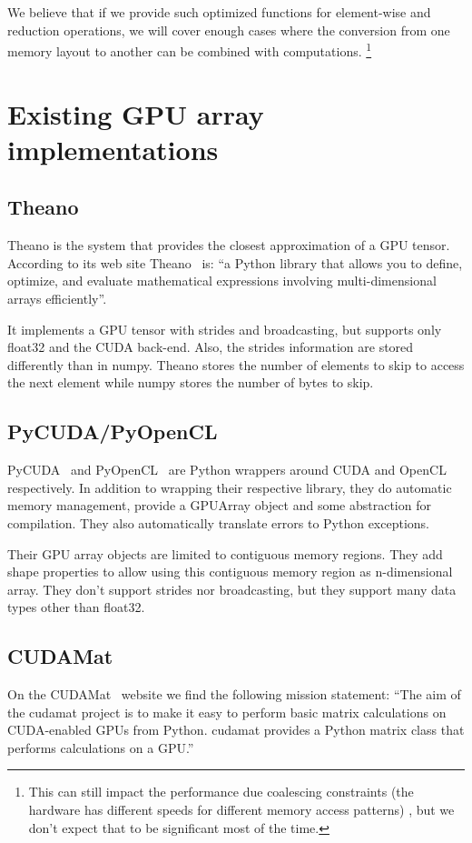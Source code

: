 \documentclass{article} %
\begin{document}
We believe that if we provide such optimized functions for element-wise and reduction operations, we will cover enough cases where the conversion from one memory layout to another can be combined with computations.
\footnote{This can still impact the performance due coalescing constraints (the hardware has different speeds for different memory access patterns) , but we don't expect that to be significant most of the time.}

\section{Existing GPU array implementations}
\subsection{Theano}
Theano is the system that provides the closest approximation of a GPU tensor. 
According to its web site Theano~\citep{bergstra+al:2010-scipy} is: ``a Python library that allows you to define, optimize, and evaluate mathematical expressions involving multi-dimensional arrays efficiently''.

It implements a GPU tensor with strides and broadcasting, but supports only float32 and the CUDA back-end.
Also, the strides information are stored differently than in numpy.
Theano stores the number of elements to skip to access the next element while numpy stores the number of bytes to skip.

\subsection{PyCUDA/PyOpenCL}
PyCUDA~\citep{kloeckner_pycuda_2009} and PyOpenCL~\citep{kloeckner_pycuda_2009} are Python wrappers around CUDA and OpenCL respectively.
In addition to wrapping their respective library, they do automatic memory management, provide a GPUArray object and some abstraction for compilation.
They also automatically translate errors to Python exceptions.

Their GPU array objects are limited to contiguous memory regions.
They add shape properties to allow using this contiguous memory region as n-dimensional array.
They don't support strides nor broadcasting, but they support many data types other than float32.

\subsection{CUDAMat}
On the CUDAMat~\citep{cudamat-TR2009} website we find the following mission statement: ``The aim of the cudamat project is to make it easy to perform basic matrix calculations on CUDA-enabled GPUs from Python. cudamat provides a Python matrix class that performs calculations on a GPU.''
\end{document}
